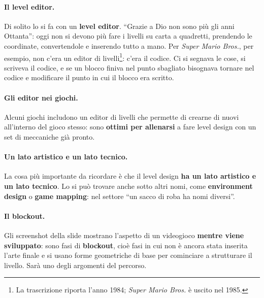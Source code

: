 \paragraph{Il level editor.} Di solito lo si fa con un \textbf{level editor}.
``Grazie a Dio non sono più gli anni Ottanta'': oggi non si devono più fare i
livelli su carta a quadretti, prendendo le coordinate, convertendole e
inserendo tutto a mano. Per \emph{Super Mario Bros.}, per esempio, non c'era un
editor di livelli\footnote{La trascrizione riporta l'anno 1984; \emph{Super
Mario Bros.} è uscito nel 1985.}: c'era il codice. Ci si segnava le cose, si
scriveva il codice, e se un blocco finiva nel punto sbagliato bisognava
tornare nel codice e modificare il punto in cui il blocco era scritto.

\paragraph{Gli editor nei giochi.} Alcuni giochi includono un editor di
livelli che permette di crearne di nuovi all'interno del gioco stesso: sono
\textbf{ottimi per allenarsi} a fare level design con un set di meccaniche già
pronto.

\paragraph{Un lato artistico e un lato tecnico.} La cosa più importante da
ricordare è che il level design \textbf{ha un lato artistico e un lato
tecnico}. Lo si può trovare anche sotto altri nomi, come
\textbf{environment design} o \textbf{game mapping}: nel settore ``un sacco di
roba ha nomi diversi''.

\paragraph{Il blockout.} Gli screenshot della slide mostrano l'aspetto di un
videogioco \textbf{mentre viene sviluppato}: sono fasi di \textbf{blockout},
cioè fasi in cui non è ancora stata inserita l'arte finale e si usano forme
geometriche di base per cominciare a strutturare il livello. Sarà uno degli
argomenti del percorso.

